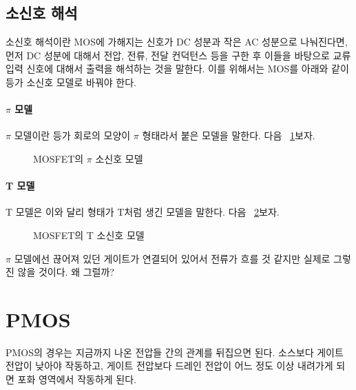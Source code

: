 \subsection{소신호 해석}
소신호 해석이란 MOS에 가해지는 신호가 DC 성분과 작은 AC 성분으로 나눠진다면, 먼저 DC 성분에 대해서 전압, 전류, 전달 컨덕턴스 등을 구한 후 이들을 바탕으로 교류 입력 신호에 대해서 출력을 해석하는 것을 말한다.
이를 위해서는 MOS를 아래와 같이 등가 소신호 모델로 바꿔야 한다.
\paragraph{$\pi$ 모델}
$\pi$ 모델이란 등가 회로의 모양이 $\pi$ 형태라서 붙은 모델을 말한다. 다음 \figurename~\ref{fig:mos pi small signal model}\을 보자.
\begin{figure}[!hpb]
    \centering
    \caption{MOSFET의 $\pi$ 소신호 모델}\label{fig:mos pi small signal model}
\end{figure}
\paragraph{T 모델}
T 모델은 이와 달리 형태가 T처럼 생긴 모델을 말한다. 다음 \figurename~\ref{fig:mos t small signal model}\을 보자.
\begin{figure}[!tpb]
    \centering
    \caption{MOSFET의 T 소신호 모델}\label{fig:mos t small signal model}
\end{figure}
$\pi$ 모델에선 끊어져 있던 게이트가 연결되어 있어서 전류가 흐를 것 같지만 실제로 그렇진 않을 것이다. 왜 그럴까?

\section{PMOS}
PMOS의 경우는 지금까지 나온 전압들 간의 관계를 뒤집으면 된다. 소스보다 게이트 전압이 낮아야 작동하고, 게이트 전압보다 드레인 전압이 어느 정도 이상 내려가게 되면 포화 영역에서 작동하게 된다.
